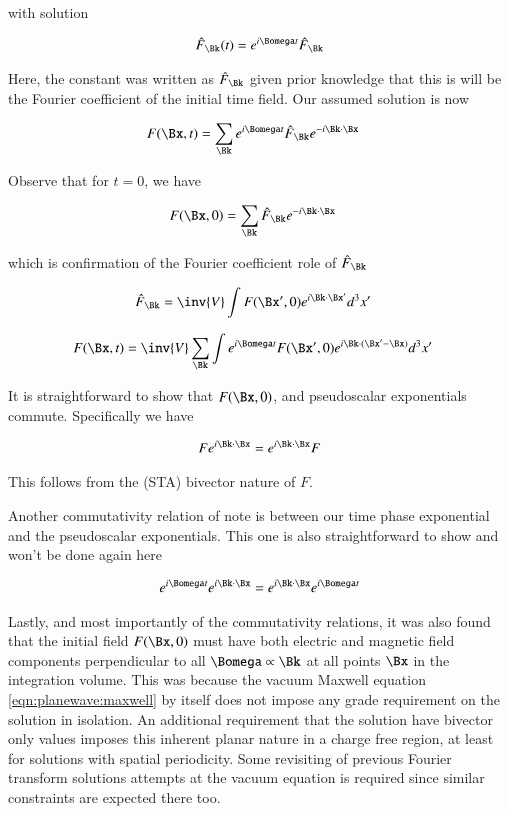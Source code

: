 with solution

\begin{align}
\hat{F}_{\Bk}(t) = e^{i \Bomega t} \hat{F}_{\Bk}
\end{align}

Here, the constant was written as $\hat{F}_{\Bk}$ given prior knowledge that this is will be the Fourier coefficient of the
initial time field.  Our assumed solution is now

\begin{align}\label{eqn:planewave:assummedSolutionNewStartingPoint}
F(\Bx,t) &= \sum_{\Bk} e^{i \Bomega t} \hat{F}_{\Bk} e^{-i \Bk \cdot \Bx}
\end{align}

Observe that for $t = 0$, we have

\begin{align*}
F(\Bx,0) &= \sum_{\Bk} \hat{F}_{\Bk} e^{-i \Bk \cdot \Bx}
\end{align*}

which is confirmation of the Fourier coefficient role of $\hat{F}_{\Bk}$

\begin{align}
\hat{F}_{\Bk} &= \inv{V} \int F(\Bx', 0) e^{ i \Bk \cdot \Bx' } d^3 x'
\end{align}

\begin{align}\label{eqn:planewave:solutionFromInitialConditions}
F(\Bx,t) &= \inv{V} \sum_{\Bk} \int e^{i \Bomega t} F(\Bx', 0) e^{i \Bk \cdot (\Bx'-\Bx) } d^3 x'
\end{align}

It is straightforward to show that $F(\Bx, 0)$, and pseudoscalar exponentials commute.  Specifically we have

\begin{align}
F e^{ i \Bk \cdot \Bx } = e^{ i \Bk \cdot \Bx } F
\end{align}

This follows from the (STA) bivector nature of $F$.

Another commutativity relation of note is between our time phase exponential and the pseudoscalar exponentials.  This one is also straightforward to show
and won't be done again here

\begin{align}
e^{ i \Bomega t} e^{ i \Bk \cdot \Bx } = e^{ i \Bk \cdot \Bx } e^{ i \Bomega t}
\end{align}

Lastly, and most importantly of the commutativity relations,
it was also found that the initial field $F(\Bx,0)$ must have both electric and magnetic field components perpendicular to all $\Bomega \propto \Bk$ at all points
$\Bx$ in the integration volume.
This was because the vacuum Maxwell equation \ref{eqn:planewave:maxwell} by itself does not impose any grade requirement on the solution in isolation.  An
additional requirement that the solution have bivector only values imposes this inherent planar nature in a charge free region, at least for solutions
with spatial periodicity.  Some revisiting of previous Fourier transform solutions attempts at the vacuum equation is required since similar constraints are
expected there too.

